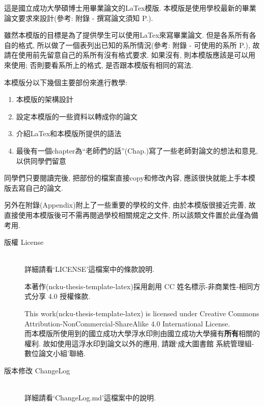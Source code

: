
這是國立成功大學碩博士用畢業論文的LaTex模版. 本模版是使用學校最新的畢業論文要求來設計(參考: 附錄 - 撰寫論文須知 P.).

雖然本模版的目標是為了提供學生可以使用LaTex來寫畢業論文. 但是各系所有各自的格式, 所以做了一個表列出已知的系所情況(參考: 附錄 - 可使用的系所 P.), 故請在使用前先留意自己的系所有沒有格式要求. 如果沒有, 則本模版應該是可以用來使用; 否則要看系所上的格式, 是否跟本模版有相同的寫法.

本模版分以下幾個主要部份來進行教學:

\begin{enumerate}
  \item 本模版的架構設計
  \item 設定本模版的一些資料以轉成你的論文
  \item 介紹LaTex和本模版所提供的語法
  \item 最後有一個chapter為``老師們的話''(Chap.)寫了一些老師對論文的想法和意見, 以供同學們留意
\end{enumerate}

同學們只要閱讀完後, 把部份的檔案直接copy和修改內容, 應該很快就能上手本模版去寫自己的論文.

另外在附錄(Appendix)附上了一些重要的學校的文件, 由於本模版很接近完善, 故直接使用本模版後可不需再閱過學校相關規定之文件, 所以該類文件置於此僅為備考用.

\newpage

\begin{description}
  \item[版權 License]\hfill\\
  詳細請看`LICENSE'這檔案中的條款說明.\\


    本著作(ncku-thesis-template-latex)採用創用 CC 姓名標示-非商業性-相同方式分享 4.0 授權條款.

    This work(ncku-thesis-template-latex) is licensed under Creative Commons Attribution-NonCommercial-ShareAlike 4.0 International License.\\

  而本模版所使用到的國立成功大學浮水印則由國立成功大學擁有\textbf{所有}相關的權利. 故如使用這浮水印到論文以外的應用, 請跟`成大圖書館 系統管理組-數位論文小組'聯絡.\\

  \item[版本修改 ChangeLog]\hfill\\
  詳細請看`ChangeLog.md'這檔案中的說明.
\end{description}

\EndChapter
